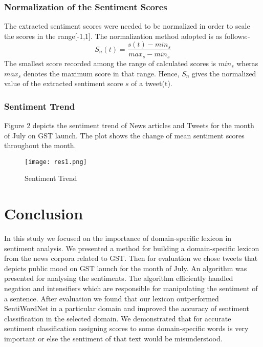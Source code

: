 \documentclass[a4paper, 10pt, conference]{ieeeconf}
\begin{document}
\subsubsection{Normalization of the Sentiment Scores}
The extracted sentiment scores were needed to be normalized in order to scale the scores in the range[-1,1]. The normalization method adopted {\cite{c17}} is as follows:-
\begin{equation}\label{Normalization of Sentiment Score}
 S_{n}(t)=\frac{s(t)-min_{s}}{max_{s}-min_{s}} 
\end{equation}	
The smallest score recorded among the range of calculated scores is \textbf{$ min_{s} $} wheras \textbf{$ max_{s} $} denotes the maximum score in that range. Hence, $ S_{n}$ gives the normalized value of the extracted sentiment score $ s $  of a tweet(t).

\subsubsection{Sentiment Trend}
Figure 2 depicts the sentiment trend of News articles and Tweets for the month of July on GST launch. The plot shows the change of mean sentiment scores throughout the month.

\begin{figure}[h!]
	\texttt{[image: res1.png]}
	\caption{Sentiment Trend}
\end{figure}


\section{Conclusion}
In this study we focused on the importance of domain-specific lexicon in sentiment analysis. We presented a method for building a domain-specific lexicon from the news corpora related to GST. Then for evaluation we chose tweets that depicts public mood on GST launch for the month of July. An algorithm was presented for analysing the sentiments. The algorithm efficiently handled negation and intensifiers which are responsible for manipulating the sentiment of a sentence. After evaluation we found that our lexicon outperformed SentiWordNet in a particular domain and improved the accuracy of sentiment classification in the selected domain. We demonstrated that for accurate  sentiment classification assigning scores to some domain-specific  words is very important or else the sentiment of that text would be misunderstood.
\end{document}
